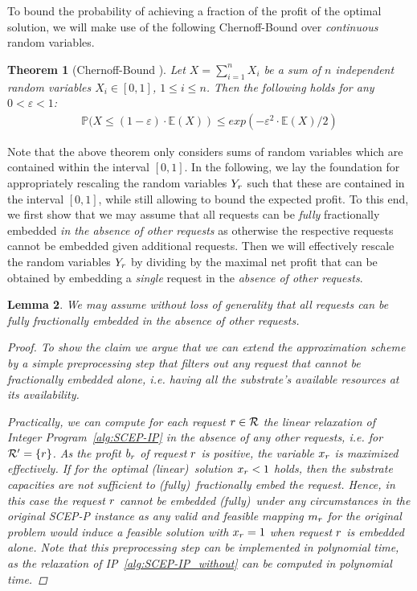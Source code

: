 \documentclass[10pt, conference, letterpaper]{IEEEtran}
\newtheorem{theorem}{Theorem}
\newtheorem{lemma}[theorem]{Lemma}
\begin{document}
To bound the probability of achieving a fraction of the profit of the optimal solution, we will make use of the following Chernoff-Bound over \emph{continuous} random variables.

\begin{theorem}[Chernoff-Bound \cite{dubhashi2009concentration}]
\label{thm:chernoff}
Let $X = \sum_{i = 1}^n X_i$ be a sum of $n$ independent random variables $X_i \in [0,1]$, $1 \leq i \leq n$. Then the following holds for any $0 < \varepsilon < 1$:
\begin{align}
\mathbb{P} \big( X \leq (1-\varepsilon)\cdot \mathbb{E}(X)~\big)~\leq exp(-\varepsilon^2\cdot \mathbb{E}(X)/2)
\end{align}
\end{theorem}

Note that the above theorem only considers sums of random variables which are contained within the interval $[0,1]$. In the following, we lay the foundation for appropriately rescaling the random variables $\randVarY$ such that these are contained in the interval $[0,1]$, while still allowing to bound the expected profit. To this end, we first show that we may assume that all requests can be \emph{fully} fractionally embedded \emph{in the absence of other requests} as otherwise the respective requests cannot be embedded given additional requests. Then we will effectively rescale the random variables $\randVarY$ by dividing by the maximal net profit that can be obtained by embedding a \emph{single} request in the \emph{absence of other requests}.

\begin{lemma}
\label{lem:all-requests-can-be-embedded}
We may assume without loss of generality that all requests can be fully fractionally embedded in the absence of other requests.
\begin{proof}
To show the claim we argue that we can extend the approximation scheme by a simple preprocessing step that filters out any request that cannot be fractionally embedded \emph{alone}, i.e. having all the substrate's available resources at its availability.

Practically, we can compute for each request $r \in \mathcal{R}$ the linear relaxation of Integer Program~\ref{alg:SCEP-IP} in the absence of any other requests, i.e. for $\mathcal{R}' = \{r\}$. As the profit $b_{r}$ of request $r$ is positive, the variable $x_{r}$ is maximized effectively. If for the optimal (linear)~solution $x_{r} < 1$ holds, then the substrate capacities are not sufficient to (fully)~fractionally embed the request. Hence, in this case the request $r$ cannot be embedded (fully)~under any circumstances in the original SCEP-P instance as any valid and feasible mapping $m_{r}$ \emph{for the original problem} would induce a feasible solution with $x_{r} = 1$ when request $r$ is embedded alone. Note that this preprocessing step can be implemented in polynomial time, as the relaxation of IP~\ref{alg:SCEP-IP_without} can be computed in polynomial time.
\end{proof}
\end{lemma}
\end{document}
